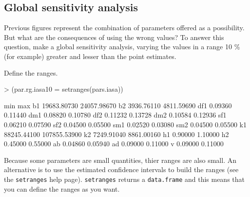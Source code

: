\documentclass[a4paper]{article}
\begin{document}
\subsection{Global sensitivity analysis}
Previous figures represent the combination of parameters offered as a possibility. But what are the consequences of using the wrong values? To answer this question, make a global sensitivity analysis, varying the values in a range 10 \% (for example) greater and lesser than the point estimates.

Define the ranges.
\begin{Schunk}
\begin{Sinput}
> (par.rg.iasa10 = setranges(pars.iasa))
\end{Sinput}
\begin{Soutput}
            min          max
b1  19683.80730  24057.98670
b2   3936.76110   4811.59690
df1     0.09360      0.11440
dm1     0.08820      0.10780
df2     0.11232      0.13728
dm2     0.10584      0.12936
sf1     0.06210      0.07590
sf2     0.04500      0.05500
sm1     0.02520      0.03080
sm2     0.04500      0.05500
k1  88245.44100 107855.53900
k2   7249.91040   8861.00160
h1      0.90000      1.10000
h2      0.45000      0.55000
ab      0.04860      0.05940
ad      0.09000      0.11000
v       0.09000      0.11000
\end{Soutput}
\end{Schunk}

Because some parameters are small quantities, thier ranges are also small. An alternative is to use the estimated confidence intervals to build the ranges (see the \texttt{setranges} help page). \texttt{setranges} returns a \texttt{data.frame} and this means that you can define the ranges as you want.
\end{document}
